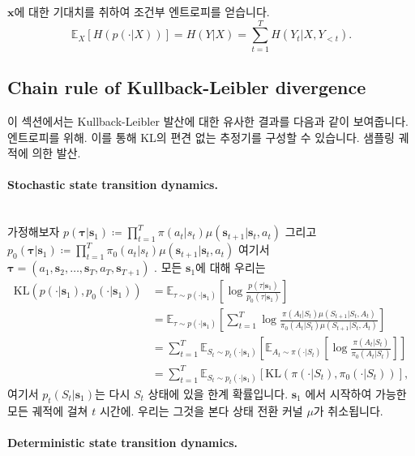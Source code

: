 \documentclass{article}
\def\s{{\bm{s}}}
\def\x{{\bm{x}}}
\def\tauv{{\bm{\tau}}}
\def\EE{{\mathbb{E}}}
\begin{document}
$\x$에 대한 기대치를 취하여 조건부 엔트로피를 얻습니다.
 \begin{equation} 
 \EE _X \left [H(p( \cdot |X)) \right ] 
=
H(Y|X)
= 
 \sum _{t=1}^T H(Y_t|X, Y_{<t}).
 \end{equation}

\subsection{Chain rule of Kullback-Leibler divergence} 
 \label{sec:chain_rule_of_kl}

이 섹션에서는 Kullback-Leibler 발산에 대한 유사한 결과를 다음과 같이 보여줍니다.
엔트로피를 위해.  이를 통해 KL의 편견 없는 추정기를 구성할 수 있습니다.
샘플링 궤적에 의한 발산.

\paragraph{Stochastic state transition dynamics.} \mbox{} \\

가정해보자 
 $p(\tauv|\s_1) \coloneqq \prod_{t=1}^T \pi(a_t|s_t) \mu(\s_{t+1}|\s_t, a_t)$  
그리고
 $p_0(\tauv|\s_1) \coloneqq \prod_{t=1}^T \pi_0(a_t|s_t) \mu(\s_{t+1}|\s_t, a_t)$ 
여기서 $\tauv = (a_1, \s_2, \dots, \s_T, a_T, \s_{T+1})$ .
모든 $\s_1$에 대해 우리는
 \begin{align}  
 \mathrm{KL} (p( \cdot | \s _1), p_0( \cdot | \s _1)) 
&= \EE _{ \tau \sim p( \cdot | \s _1)} \left [ \log \frac{p(\tau|\s_1)} {p_0( \tau | \s _1)} \right ] \\
&= \EE _{ \tau \sim p( \cdot | \s _1)} \left [ \sum _{t=1}^T \log \frac { \pi (A_t|S_t) \mu (S_{t+1}|S_t,A_t)}{ \pi _0(A_t|S_t) \mu (S_{t+1}|S_t,A_t)} \right ]\\ 
&= \sum _{t=1}^T \EE _{S_t \sim p_t( \cdot | \s _1)} \left [ \EE _{A_t \sim \pi ( \cdot |S_t)} \left [ \log \frac{\pi(A_t|S_t)} { \pi _0(A_t|S_t)} \right ] \right ] \\
&= \sum _{t=1}^T \EE _{S_t \sim p_t( \cdot | \s _1)} \left [ \mathrm{KL} ( \pi ( \cdot |S_t), \pi _0( \cdot |S_t)) \right ],
 \end{align} 
여기서 $p_t(S_t|\s_1)$는 다시 $S_t$ 상태에 있을 한계 확률입니다. 
$\s_1$ 에서 시작하여 가능한 모든 궤적에 걸쳐 $t$ 시간에.  우리는 그것을 본다
상태 전환 커널 $\mu$가 취소됩니다.

\paragraph{Deterministic state transition dynamics.} \mbox{} \\
\end{document}

